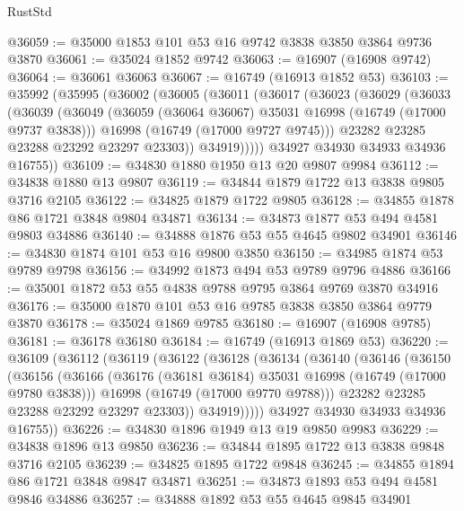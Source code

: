\begin{lexlean}{RustStd}
\begin{coremodule}
@36059 := @35000 @1853 @101 @53 @16 @9742 @3838 @3850 @3864 @9736 @3870
@36061 := @35024 @1852 @9742
@36063 := @16907 (@16908 @9742)
@36064 := @36061 @36063
@36067 := @16749 (@16913 @1852 @53)
@36103 := @35992
    (@35995
      (@36002
        (@36005
          (@36011
            (@36017
              (@36023
                (@36029
                  (@36033
                    (@36039
                      (@36049
                        (@36059 (@36064 @36067) @35031 @16998 (@16749 (@17000 @9737 @3838)))
                        @16998
                        (@16749 (@17000 @9727 @9745)))
                      @23282
                      @23285
                      @23288
                      @23292
                      @23297
                      @23303))
                  @34919)))))
        @34927
        @34930
        @34933
        @34936
        @16755))
@36109 := @34830 @1880 @1950 @13 @20 @9807 @9984
@36112 := @34838 @1880 @13 @9807
@36119 := @34844 @1879 @1722 @13 @3838 @9805 @3716 @2105
@36122 := @34825 @1879 @1722 @9805
@36128 := @34855 @1878 @86 @1721 @3848 @9804 @34871
@36134 := @34873 @1877 @53 @494 @4581 @9803 @34886
@36140 := @34888 @1876 @53 @55 @4645 @9802 @34901
@36146 := @34830 @1874 @101 @53 @16 @9800 @3850
@36150 := @34985 @1874 @53 @9789 @9798
@36156 := @34992 @1873 @494 @53 @9789 @9796 @4886
@36166 := @35001 @1872 @53 @55 @4838 @9788 @9795 @3864 @9769 @3870 @34916
@36176 := @35000 @1870 @101 @53 @16 @9785 @3838 @3850 @3864 @9779 @3870
@36178 := @35024 @1869 @9785
@36180 := @16907 (@16908 @9785)
@36181 := @36178 @36180
@36184 := @16749 (@16913 @1869 @53)
@36220 := @36109
    (@36112
      (@36119
        (@36122
          (@36128
            (@36134
              (@36140
                (@36146
                  (@36150
                    (@36156
                      (@36166
                        (@36176 (@36181 @36184) @35031 @16998 (@16749 (@17000 @9780 @3838)))
                        @16998
                        (@16749 (@17000 @9770 @9788)))
                      @23282
                      @23285
                      @23288
                      @23292
                      @23297
                      @23303))
                  @34919)))))
        @34927
        @34930
        @34933
        @34936
        @16755))
@36226 := @34830 @1896 @1949 @13 @19 @9850 @9983
@36229 := @34838 @1896 @13 @9850
@36236 := @34844 @1895 @1722 @13 @3838 @9848 @3716 @2105
@36239 := @34825 @1895 @1722 @9848
@36245 := @34855 @1894 @86 @1721 @3848 @9847 @34871
@36251 := @34873 @1893 @53 @494 @4581 @9846 @34886
@36257 := @34888 @1892 @53 @55 @4645 @9845 @34901

\end{coremodule}
\end{lexlean}
